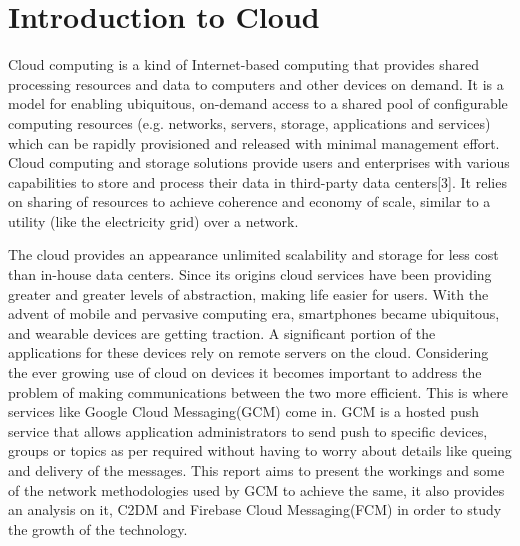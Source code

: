 \newpage
\tableofcontents
\listoffigures
\newpage
\renewcommand{\abstractname}{\Large Abstract}
	
\newpage
{}
\section{Introduction to Cloud}
Cloud computing is a kind of Internet-based computing that provides shared processing resources and data to computers and other devices on demand. It is a model for enabling ubiquitous, on-demand access to a shared pool of configurable computing resources (e.g. networks, servers, storage, applications and services)\cite{dcc}\cite{4} which can be rapidly provisioned and released with minimal management effort. Cloud computing and storage solutions provide users and enterprises with various capabilities to store and process their data in third-party data centers[3]. It relies on sharing of resources to achieve coherence and economy of scale, similar to a utility (like the electricity grid) over a network\cite{ccwiki}.

The cloud provides an appearance unlimited scalability and storage for less cost than in-house data centers. Since its origins cloud services have been providing greater and greater levels of abstraction, making life easier for users. With the advent of mobile and pervasive computing era,
smartphones became ubiquitous, and wearable devices are
getting traction. A significant portion of the applications for
these devices rely on remote servers on the cloud. Considering the ever growing use of cloud on devices it becomes important to address the problem of making communications between the two more efficient. This is where services like Google Cloud Messaging(GCM) come in. GCM is a hosted push service that allows application administrators to send push to specific devices, groups or topics as per required without having to worry about details like queing and delivery of the messages. This report aims to present the workings and some of the network methodologies used by GCM to achieve the same, it also provides an analysis on it, C2DM and Firebase Cloud Messaging(FCM) in order to study the growth of the technology.
